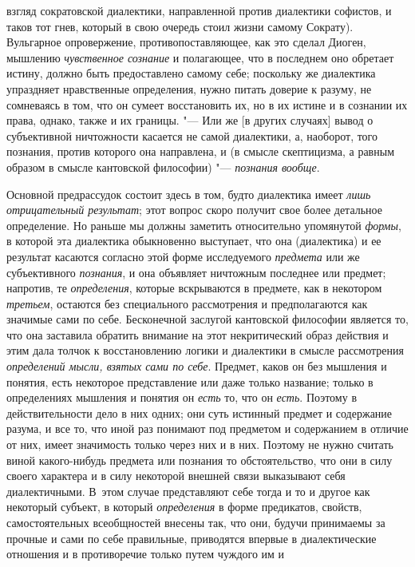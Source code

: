 {{взгляд сократовской диалектики, направленной против диалектики софистов, и
таков тот гнев, который в свою очередь стоил жизни самому Сократу).
Вульгарное опровержение, противопоставляющее, как это сделал Диоген,
мышлению {\em чувственное сознание}
и полагающее, что в последнем оно обретает истину, должно
быть предоставлено самому себе; поскольку же диалектика упраздняет
нравственные определения, нужно питать доверие к разуму, не сомневаясь в
том, что он сумеет восстановить их, но в их истине и в сознании их права,
однако, также и их границы. "--- Или же [в других случаях]
вывод о субъективной ничтожности касается не самой диалектики, а, наоборот,
того познания, против которого она направлена, и (в смысле скептицизма, а
равным образом в смысле кантовской философии) "--- {\em познания вообще}.

Основной предрассудок состоит здесь в том, будто диалектика
имеет {\em лишь отрицательный
результат}; этот вопрос скоро получит свое более детальное
определение. Но раньше мы должны заметить относительно упомянутой
{\em формы}, в которой
эта диалектика обыкновенно выступает, что она (диалектика) и ее результат
касаются согласно этой форме исследуемого {\em предмета} или же
субъективного {\em познания}, и она объявляет ничтожным последнее или
предмет; напротив, те {\em определения},
которые вскрываются в предмете, как в некотором {\em третьем}, остаются
без специального рассмотрения и предполагаются как значимые сами по себе.
\label{bkm:bm126a}Бесконечной заслугой кантовской философии
является то, что она заставила обратить внимание на этот некритический
образ действия и этим дала толчок к восстановлению логики и диалектики в
смысле рассмотрения {\em определений
мысли, взятых сами по себе}. Предмет, каков он без мышления
и понятия, есть некоторое представление или даже только название; только в
определениях мышления и понятия он {\em есть} то, что он {\em есть}. Поэтому
в действительности дело в них одних; они суть истинный предмет и содержание
разума, и все то, что иной раз понимают под предметом и содержанием в
отличие от них, имеет значимость только через них и в них. Поэтому не нужно
считать виной какого-нибудь предмета или познания то обстоятельство, что
они в силу своего характера и в силу некоторой внешней связи выказывают
себя диалектичными. В~этом случае представляют себе тогда и то и другое как
некоторый субъект, в который {\em определения} в форме
предикатов, свойств, самостоятельных всеобщностей внесены так, что они,
будучи принимаемы за прочные и сами по себе правильные, приводятся впервые
в диалектические отношения и в противоречие только путем чуждого им и
}}
